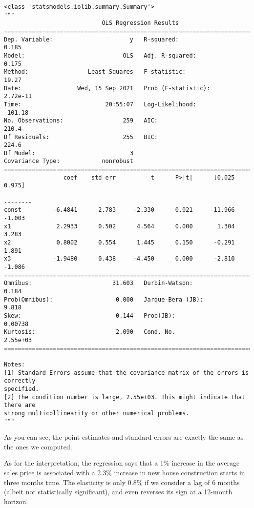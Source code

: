 \documentclass[10pt]{scrartcl}
\makeatletter
\newcommand{\boxspacing}{\kern\kvtcb@left@rule\kern\kvtcb@boxsep}
\newcommand{\prompt}[4]{
        {\ttfamily\llap{{\color{#2}[#3]:\hspace{3pt}#4}}\vspace{-\baselineskip}}
    }
\makeatother
\begin{document}
            \begin{tcolorbox}[breakable, size=fbox, boxrule=.5pt, pad at break*=1mm, opacityfill=0]
\prompt{Out}{outcolor}{25}{\boxspacing}
\begin{Verbatim}[commandchars=\\\{\}]
<class 'statsmodels.iolib.summary.Summary'>
"""
                            OLS Regression Results
==============================================================================
Dep. Variable:                      y   R-squared:                       0.185
Model:                            OLS   Adj. R-squared:                  0.175
Method:                 Least Squares   F-statistic:                     19.27
Date:                Wed, 15 Sep 2021   Prob (F-statistic):           2.72e-11
Time:                        20:55:07   Log-Likelihood:                -101.18
No. Observations:                 259   AIC:                             210.4
Df Residuals:                     255   BIC:                             224.6
Df Model:                           3
Covariance Type:            nonrobust
==============================================================================
                 coef    std err          t      P>|t|      [0.025      0.975]
------------------------------------------------------------------------------
const         -6.4841      2.783     -2.330      0.021     -11.966      -1.003
x1             2.2933      0.502      4.564      0.000       1.304       3.283
x2             0.8002      0.554      1.445      0.150      -0.291       1.891
x3            -1.9480      0.438     -4.450      0.000      -2.810      -1.086
==============================================================================
Omnibus:                       31.603   Durbin-Watson:                   0.184
Prob(Omnibus):                  0.000   Jarque-Bera (JB):                9.818
Skew:                          -0.144   Prob(JB):                      0.00738
Kurtosis:                       2.090   Cond. No.                     2.55e+03
==============================================================================

Notes:
[1] Standard Errors assume that the covariance matrix of the errors is correctly
specified.
[2] The condition number is large, 2.55e+03. This might indicate that there are
strong multicollinearity or other numerical problems.
"""
\end{Verbatim}
\end{tcolorbox}
        
    As you can see, the point estimates and standard errors are exactly the
same as the ones we computed.

As for the interpretation, the regression says that a 1\% increase in
the average sales price is associated with a 2.3\% increase in new house
construction starts in three months time. The elasticity is only 0.8\%
if we consider a lag of 6 months (albeit not statistically significant),
and even reverses its sign at a 12-month horizon.


    
    
    
\end{document}
